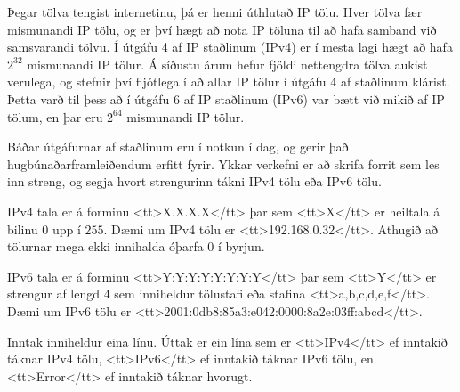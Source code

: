 
Þegar tölva tengist internetinu, þá er henni úthlutað IP tölu. Hver tölva fær
mismunandi IP tölu, og er því hægt að nota IP töluna til að hafa samband við
samsvarandi tölvu. Í útgáfu 4 af IP staðlinum (IPv4) er í mesta lagi hægt að hafa
$2^{32}$ mismunandi IP tölur. Á síðustu árum hefur fjöldi nettengdra tölva
aukist verulega, og stefnir því fljótlega í að allar IP tölur í útgáfu 4 af
staðlinum klárist. Þetta varð til þess að í útgáfu 6 af IP staðlinum (IPv6) var bætt
við mikið af IP tölum, en þar eru $2^{64}$ mismunandi IP tölur.

Báðar útgáfurnar af staðlinum eru í notkun í dag, og gerir það
hugbúnaðarframleiðendum erfitt fyrir. Ykkar verkefni er að skrifa forrit sem
les inn streng, og segja hvort strengurinn tákni IPv4 tölu eða IPv6 tölu.

IPv4 tala er á forminu <tt>X.X.X.X</tt> þar sem <tt>X</tt> er heiltala á bilinu
$0$ upp í $255$. Dæmi um IPv4 tölu er <tt>192.168.0.32</tt>. Athugið að
tölurnar mega ekki innihalda óþarfa $0$ í byrjun.

IPv6 tala er á forminu <tt>Y:Y:Y:Y:Y:Y:Y:Y</tt> þar sem <tt>Y</tt> er strengur
af lengd 4 sem inniheldur tölustafi eða stafina <tt>a,b,c,d,e,f</tt>. Dæmi um
IPv6 tölu er <tt>2001:0db8:85a3:e042:0000:8a2e:03ff:abcd</tt>.

Inntak inniheldur eina línu. Úttak er ein lína sem er <tt>IPv4</tt> ef inntakið
táknar IPv4 tölu, <tt>IPv6</tt> ef inntakið táknar IPv6 tölu, en <tt>Error</tt>
ef inntakið táknar hvorugt.

